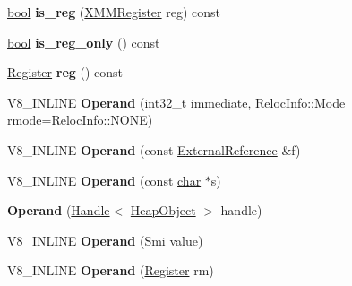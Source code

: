 \begin{DoxyCompactItemize}
\mbox{\hyperlink{classbool}{bool}} {\bfseries is\+\_\+reg} (\mbox{\hyperlink{classv8_1_1internal_1_1XMMRegister}{X\+M\+M\+Register}} reg) const
\item 
\mbox{\label{classv8_1_1internal_1_1Operand_adecdfb611d70453ff8101711e8c871f6}} 
\mbox{\hyperlink{classbool}{bool}} {\bfseries is\+\_\+reg\+\_\+only} () const
\item 
\mbox{\label{classv8_1_1internal_1_1Operand_a2a80076be6d84a6030e554639c2e3dae}} 
\mbox{\hyperlink{classv8_1_1internal_1_1Register}{Register}} {\bfseries reg} () const
\item 
\mbox{\label{classv8_1_1internal_1_1Operand_ae40d462095483591a10f5f3185b35361}} 
V8\+\_\+\+I\+N\+L\+I\+NE {\bfseries Operand} (int32\+\_\+t immediate, Reloc\+Info\+::\+Mode rmode=Reloc\+Info\+::\+N\+O\+NE)
\item 
\mbox{\label{classv8_1_1internal_1_1Operand_a538d1dcaf002542b9144b5fbc062d728}} 
V8\+\_\+\+I\+N\+L\+I\+NE {\bfseries Operand} (const \mbox{\hyperlink{classv8_1_1internal_1_1ExternalReference}{External\+Reference}} \&f)
\item 
\mbox{\label{classv8_1_1internal_1_1Operand_ac4940851b5bce9e48d3ab3b0144b99ba}} 
V8\+\_\+\+I\+N\+L\+I\+NE {\bfseries Operand} (const \mbox{\hyperlink{classchar}{char}} $\ast$s)
\item 
\mbox{\label{classv8_1_1internal_1_1Operand_a89275469683feb79dbec2790f984cf2d}} 
{\bfseries Operand} (\mbox{\hyperlink{classv8_1_1internal_1_1Handle}{Handle}}$<$ \mbox{\hyperlink{classv8_1_1internal_1_1HeapObject}{Heap\+Object}} $>$ handle)
\item 
\mbox{\label{classv8_1_1internal_1_1Operand_a027e7cab65c73c00b2ef5381724dd3be}} 
V8\+\_\+\+I\+N\+L\+I\+NE {\bfseries Operand} (\mbox{\hyperlink{classv8_1_1internal_1_1Smi}{Smi}} value)
\item 
\mbox{\label{classv8_1_1internal_1_1Operand_afa91505837ddc2da0a1e92af8b54b097}} 
V8\+\_\+\+I\+N\+L\+I\+NE {\bfseries Operand} (\mbox{\hyperlink{classv8_1_1internal_1_1Register}{Register}} rm)

\end{DoxyCompactItemize}

